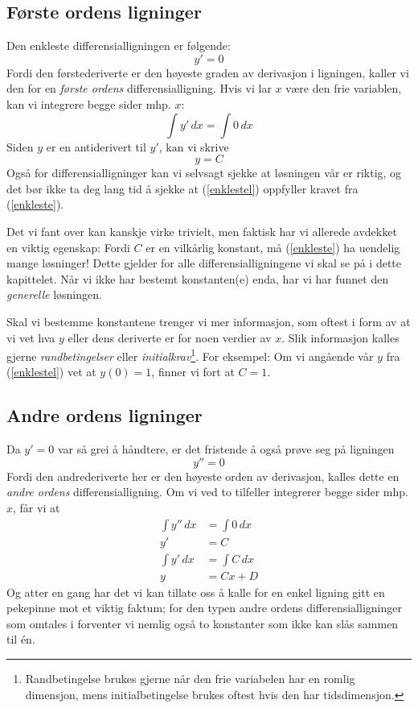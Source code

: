 \subsection{Første ordens ligninger}
Den enkleste differensialligningen er følgende:
\begin{equation}
y'=0  \label{enkleste}
\end{equation}
Fordi den førstederiverte er den høyeste graden av derivasjon i ligningen, kaller vi den for en \textit{første ordens} differensialligning. Hvis vi lar $ x $ være den frie variablen, kan vi integrere begge sider mhp. $ x $:
\[ \int y' \,dx = \int 0 \,dx \]
Siden $ y $ er en antiderivert til $ y' $, kan vi skrive
\begin{equation}
y = C \label{enklestel}
\end{equation}
Også for differensialligninger kan vi selvsagt sjekke at løsningen vår er riktig, og det bør ikke ta deg lang tid å sjekke at (\ref{enklestel}) oppfyller kravet fra (\ref{enkleste}).\vsk

Det vi fant over kan kanskje virke trivielt, men faktisk har vi allerede avdekket en viktig egenskap: Fordi $ C $ er en vilkårlig konstant, må (\ref{enkleste}) ha uendelig mange løsninger! Dette gjelder for alle differensialligningene vi skal se på i dette kapittelet. Når vi ikke har bestemt konstanten(e) enda, har vi har funnet den \textit{generelle} løsningen.\vsk

Skal vi bestemme konstantene trenger vi mer informasjon, som oftest i form av at vi vet hva $ y$ eller dens deriverte er for noen verdier av $ x $. Slik informasjon kalles gjerne \textit{randbetingelser} eller \textit{initialkrav}\footnote{Randbetingelse brukes gjerne når den frie variabelen har en romlig dimensjon, mens initialbetingelse brukes oftest hvis den har tidsdimensjon.}. For eksempel: Om vi angående vår $ y $ fra (\ref{enklestel}) vet at $  {y(0)=1 }$, finner vi fort at $ {C=1} $.

\subsection{Andre ordens ligninger}
Da $ {y'=0 }$ var så grei å håndtere, er det fristende å også prøve seg på ligningen
\[ y''=0 \]
Fordi den andrederiverte her er den høyeste orden av derivasjon, kalles dette en \textit{andre ordens} differensialligning. Om vi ved to tilfeller integrerer begge sider mhp. $ x $, får vi at
\begin{align}
	\int y''\, dx &= \int 0 \, dx \nonumber\\
	y' &= C \nonumber\\
	\int y'\, dx &= \int C \, dx \nonumber\\
	y &= Cx + D
\end{align}
Og atter en gang har det vi kan tillate oss å kalle for en enkel ligning gitt en pekepinne mot et viktig faktum; for den typen andre ordens differensialligninger som omtales i  forventer vi nemlig også to konstanter som ikke kan slås sammen til én.

